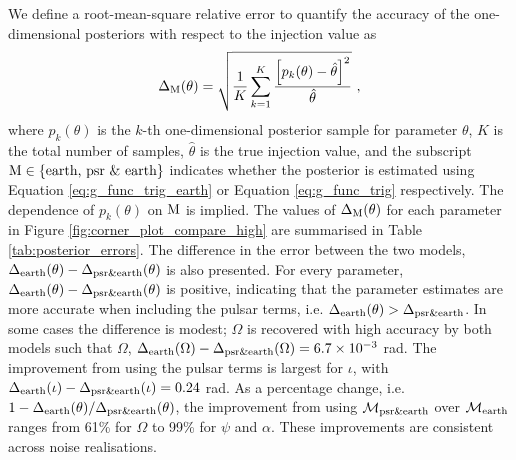 \documentclass[fleqn,usenatbib,useAMS]{mnras}
\begin{document}
We define a root-mean-square relative error to quantify the accuracy of the one-dimensional posteriors with respect to the injection value as
\begin{equation}
\Delta_{\rm M}(\theta) = \sqrt{\frac{1}{K}\sum_{k=1}^{K} \frac{ \left[p_k(\theta) - \hat{\theta}\right]^2}{\hat{\theta}}} \ , \label{eq:mean_rel_error}
\end{equation}
where $p_k(\theta)$ is the $k$-th one-dimensional posterior sample for parameter $\theta$, $K$ is the total number of samples, $\hat{\theta}$ is the true injection value, and the subscript ${\rm M} \in \{ \text{earth, psr \& earth} \}$ indicates whether the posterior is estimated using Equation \eqref{eq:g_func_trig_earth} or Equation \eqref{eq:g_func_trig} respectively. The dependence of $p_k(\theta)$ on ${\rm M}$ is implied. The values of $\Delta_{\rm M}(\theta)$ for each parameter in Figure \ref{fig:corner_plot_compare_high} are summarised in Table \ref{tab:posterior_errors}. The difference in the error between the two models, $\Delta_{\rm earth}(\theta)-\Delta_{\rm psr \& earth}(\theta)$ is also presented. For every parameter, $\Delta_{\rm earth}(\theta)-\Delta_{\rm psr \& earth}(\theta)$ is positive, indicating that the parameter estimates are more accurate when including the pulsar terms, i.e. $\Delta_{\rm earth}(\theta) > \Delta_{\rm psr \& earth}$. In some cases the difference is modest;  $\Omega$ is recovered with high accuracy by both models such that $\Omega$, $\Delta_{\rm earth}(\Omega)-\Delta_{\rm psr \& earth}(\Omega) = 6.7 \times 10^{-3}$ rad. The improvement from using the pulsar terms is largest for $\iota$, with $\Delta_{\rm earth}(\iota) - \Delta_{\rm psr \& earth}(\iota)  = 0.24$ rad. As a percentage change, i.e. $1 - \Delta_{\rm earth}(\theta)/\Delta_{\rm psr \& earth}(\theta)$, the improvement from using $\mathcal{M}_{\rm psr \& earth}$ over $\mathcal{M}_{\rm earth}$ ranges from 61\% for $\Omega$ to 99\% for $\psi$ and $\alpha$. These improvements are consistent across noise realisations. \newline 
\end{document}
